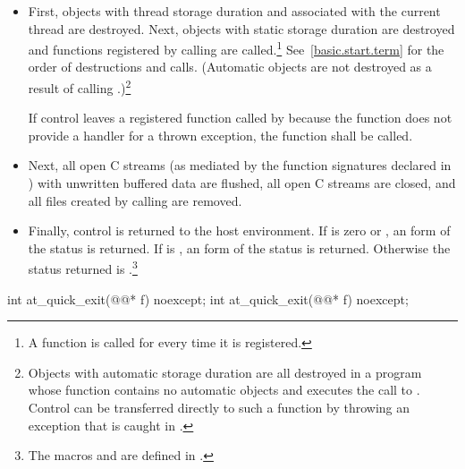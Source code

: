 \begin{itemdescr}
\pnum
\effects
\begin{itemize}
\item
First, objects with thread storage duration and associated with the current thread
are destroyed. Next, objects with static storage duration are destroyed
and functions registered by calling
are called.\footnote{A function is called for every time it is registered.}
See~\ref{basic.start.term} for the order of destructions and calls.
(Automatic objects are not destroyed as a result of calling
.)\footnote{Objects with automatic storage duration are all destroyed in a program whose
 function
contains no automatic objects and executes the call to
.
Control can be transferred directly to such a
 function
by throwing an exception that is caught in
.}

If control leaves a registered function called by  because the function does
not provide a handler for a thrown exception, the function  shall be called.%
%

\item
Next, all open C streams (as mediated by the function
signatures declared in
)
with unwritten buffered data are flushed, all open C
streams are closed, and all files created by calling
are removed.

\item
Finally, control is returned to the host environment.
If  is zero or
,
an 
form of the status
is returned.
If  is
,
an  form of the status
is returned.
Otherwise the status returned is .\footnote{The macros
and
are defined in
.}
\end{itemize}
\end{itemdescr}

%
\begin{itemdecl}
int at_quick_exit(@@* f) noexcept;
int at_quick_exit(@@* f) noexcept;
\end{itemdecl}

